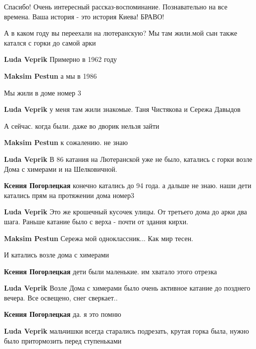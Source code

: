 \begin{itemize}
Спасибо! Очень интересный рассказ-воспоминание. Познавательно на все времена.
Ваша история - это история Киева! БРАВО!

А в каком году вы переехали на лютеранскую? Мы там жили.мой сын также катался с горки до самой арки

\begin{itemize} %
\textbf{Luda Veprik} Примерно в 1962 году

\begin{itemize} %
\textbf{Maksim Pestun} а мы в 1986

Мы жили в доме номер 3

\textbf{Luda Veprik} у меня там жили знакомые. Таня Чистякова и Сережа Давыдов

А сейчас. когда были. даже во дворик нельзя зайти

\textbf{Maksim Pestun} к сожалению. не знаю

\textbf{Luda Veprik} В 86 катания на Лютеранской уже не было, катались с горки возле Дома с химерами и на Шелковичной.

\textbf{Ксения Погорлецкая} конечно катались до 94 года. а дальше не знаю. наши дети катались прям на протяжении дома номер3

\textbf{Luda Veprik} Это же крошечный кусочек улицы. От третьего дома до арки два шага. Раньше катание было с верха - почти от здания кирхи.

\textbf{Maksim Pestun} Сережа мой одноклассник... Как мир тесен.
\end{itemize} %

И катались возле дома с химерами

\textbf{Ксения Погорлецкая} дети были маленькие. им хватало этого отрезка

\textbf{Luda Veprik} Возле Дома с химерами было очень активное катание до позднего вечера. Все освещено, снег сверкает..

\textbf{Ксения Погорлецкая} да. я это помню

\textbf{Luda Veprik} мальчишки всегда старались подрезать, крутая горка была, нужно было притормозить перед ступеньками
\end{itemize} %


\end{itemize}
